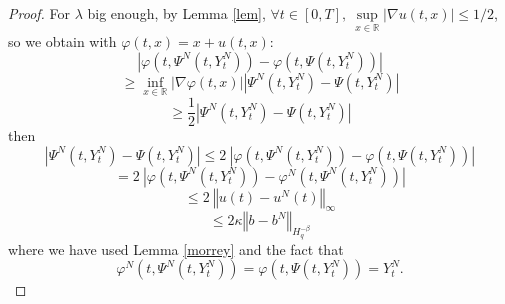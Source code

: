 \documentclass[11pt]{article}
\newcommand{\norme}[1]{\left\Vert #1\right\Vert}
\newcommand{\R}{\mathbb{R}}
\begin{document}
\begin{proof}
    For $\lambda$ big enough, by Lemma \ref{lem}, $\forall t \in[0,T],\ \underset{x\in\R}{\sup}\left|\nabla u(t,x)\right| \leq 1/2$, so we obtain with $\varphi(t,x)=x+u(t,x)$:
    \begin{equation*}
    \left|\varphi\left(t,\Psi^N\left(t,Y_t^N\right)\right)-\varphi\left(t,\Psi\left(t,Y_t^N\right)\right)\right| 
    \end{equation*}
    \begin{equation*}
    \geq \underset{x\in\R}{\inf}\left|\nabla\varphi(t,x)\right|
    \left|\Psi^N\left(t,Y_t^N\right)-\Psi\left(t,Y_t^N\right)\right|
    \end{equation*}
    \begin{equation*}
    \geq \frac{1}{2} \left|\Psi^N\left(t,Y_t^N\right)-\Psi\left(t,Y_t^N\right)\right|
    \end{equation*}    
    then
    \begin{equation*}
    \left|\Psi^N\left(t,Y_t^N\right)-\Psi\left(t,Y_t^N\right)\right|\leq 2\ \left|\varphi\left(t,\Psi^N\left(t,Y_t^N\right)\right)-\varphi\left(t,\Psi\left(t,Y_t^N\right)\right)\right|
    \end{equation*}   
    \begin{equation*}
    = 2\ \left|\varphi\left(t,\Psi^N\left(t,Y_t^N\right)\right)-\varphi^N\left(t,\Psi^N\left(t,Y_t^N\right)\right)\right|
    \end{equation*}   
    \begin{equation*}
    \leq 2\ \norme{u(t)-u^N(t)}_\infty
    \end{equation*} 
    \begin{equation}\label{other}
    \leq 2\kappa \norme{b-b^N}_{H^{-\beta}_q}
    \end{equation} 
    where we have used Lemma \ref{morrey} and the fact that \begin{equation}
    \varphi^N\left(t,\Psi^N\left(t,Y_t^N\right)\right)=\varphi\left(t,\Psi\left(t,Y_t^N\right)\right) = Y_t^N.
    \end{equation}
\end{proof}
\end{document}
